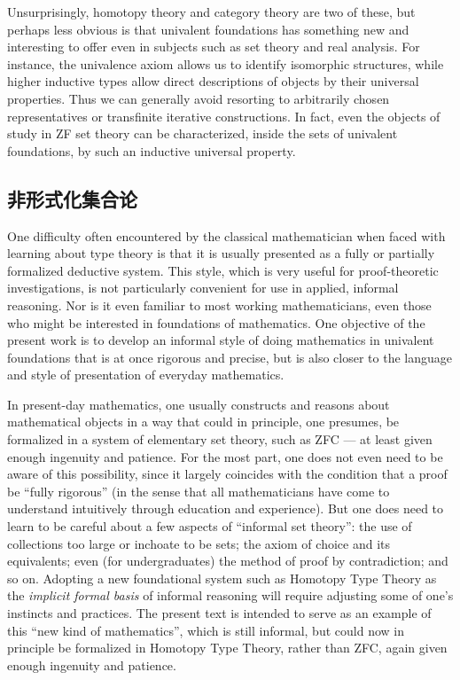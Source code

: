 Unsurprisingly, homotopy theory and category theory are two of these, but perhaps less obvious is that univalent foundations has something new and interesting to offer even in subjects such as set theory and real analysis.
For instance, the univalence axiom allows us to identify isomorphic structures, while higher inductive types allow direct descriptions of objects by their universal properties.
Thus we can generally avoid resorting to arbitrarily chosen representatives or transfinite iterative constructions.
In fact, even the objects of study in ZF set theory can be characterized, inside the sets of univalent foundations, by such an inductive universal property.

%


\subsection*{非形式化集合论}

%
%
%
%
One difficulty often encountered by the classical mathematician when faced with learning about type theory is that it is usually presented as a fully or partially formalized deductive system.
This style, which is very useful for proof-theoretic investigations, is not particularly convenient for use in applied, informal reasoning.
Nor is it even familiar to most working mathematicians, even those who might be interested in foundations of mathematics.
One objective of the present work is to develop an informal style of doing mathematics in univalent foundations that is at once rigorous and precise, but is also closer to the language and style of presentation of everyday mathematics.

In present-day mathematics, one usually constructs and reasons about mathematical objects in a way that could in principle, one presumes, be formalized in a system of elementary set theory, such as ZFC --- at least given enough ingenuity and patience.
For the most part, one does not even need to be aware of this possibility, since it largely coincides with the condition that a proof be ``fully rigorous'' (in the sense that all mathematicians have come to understand intuitively through education and experience).
But one does need to learn to be careful about a few aspects of ``informal set theory'': the use of collections too large or inchoate to be sets; the axiom of choice and its equivalents; even (for undergraduates) the method of proof by contradiction; and so on.
Adopting a new foundational system such as Homotopy Type Theory as the \emph{implicit formal basis} of informal reasoning will require adjusting some of one's instincts and practices.
The present text is intended to serve as an example of this ``new kind of mathematics'', which is still informal, but could now in principle be formalized in Homotopy Type Theory, rather than ZFC, again given enough ingenuity and patience.

